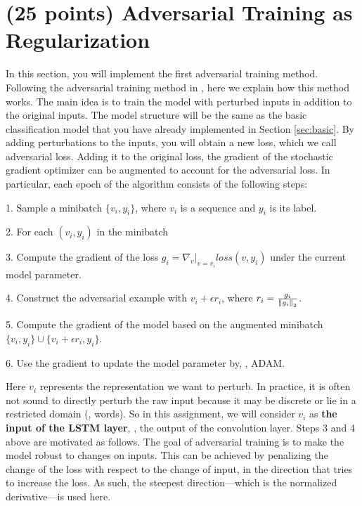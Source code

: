 \documentclass[11pt]{report}
\begin{document}
\section{ (25 points) Adversarial Training as Regularization} 
In this section, you will implement the first adversarial training method. 
Following the adversarial training method in \cite{miyato2016adversarial}, here
we explain how this method works.
The main idea is to train the model with perturbed inputs in addition to the original inputs. 
The model structure will be the same as the basic classification model that you have already implemented in Section \ref{sec:basic}.
By adding perturbations to the inputs, 
you will obtain a new loss, which we call adversarial loss. 
Adding it to the original loss, 
the gradient of the stochastic gradient optimizer can be augmented to account for the adversarial loss.
In particular, each epoch of the algorithm consists of the following steps:

1. \quad Sample a minibatch $\{v_i, y_i\}$, where $v_i$ is a sequence and $y_i$ is its label.

2. \quad For each $(v_i, y_i)$ in the minibatch

3. \quad \quad Compute the gradient of the loss 
$g_i = \nabla_{v}|_{v = v_i}  loss(v, y_i)$ under the current model parameter.

4. \quad \quad Construct the adversarial example with $v_i + \epsilon r_i$, where $r_i = \frac{g_i}{\left\|g_i\right\|_2}$.

5. \quad Compute the gradient of the model based on the augmented minibatch $\{v_i, y_i\} \cup \{v_i + \epsilon r_i, y_i\}$.

6. \quad Use the gradient to update the model parameter by, \eg, ADAM.


Here $v_i$ represents the representation we want to perturb. 
In practice, it is often not sound to directly perturb the raw input because it may be discrete or lie in a restricted domain (\eg, words).
So in this assignment, 
we will consider $v_i$ as \textbf{the input of the LSTM layer}, \ie, the output of the convolution layer.
Steps 3 and 4 above are motivated as follows.
The goal of adversarial training is to make the model robust to changes on inputs. 
This can be achieved by penalizing the change of the loss with respect to the change of input,
in the direction that tries to increase the loss.
As such, the steepest direction---which is the normalized derivative---is used here.
\end{document}
